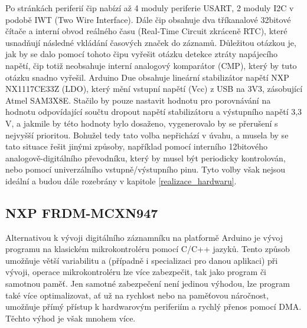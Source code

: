 Po stránkách periferií čip nabízí až 4 moduly periferie USART, 2 moduly I2C v podobě IWT (Two Wire Interface). Dále čip obsahuje dva tříkanalové 32bitové čítače a interní obvod reálného času (Real-Time Circuit zkráceně RTC), které usnadňují následné vkládání časových značek do záznamů. Důležitou otázkou je, jak by se dalo pomocí tohoto čipu vyřešit otázku detekce ztráty napájecího napětí, čip totiž neobsahuje interní analogový komparátor (CMP), který by tuto otázku snadno vyřešil. Arduino Due obsahuje lineární stabilizátor napětí NXP NX1117CE33Z (LDO), který mění vstupní napětí (Vcc) z USB na 3V3, zásobující Atmel SAM3X8E. Stačilo by pouze nastavit hodnotu pro porovnávání na hodnotu odpovídající součtu dropout napětí stabilizátoru a výstupního napětí 3,3 V, a jakmile by této hodnoty bylo dosaženo, vygenerovalo by se přerušení s nejvyšší prioritou. Bohužel tedy tato volba nepřichází v úvahu, a musela by se tato situace řešit jinými způsoby, například pomocí interního 12bitového analogově-digitálního převodníku, který by musel být periodicky kontrolován, nebo pomocí univerzálního vstupně/výstupního pinu. Tyto volby však nejsou ideální a budou dále rozebrány v kapitole \ref{realizace_hardwaru}. \cite{arduino_shop_due, nxp_NX1117C_ldo}


\subsection{NXP FRDM-MCXN947}
Alternativou k vývoji digitálního záznamníku na platformě Arduino je vývoj programu na klasickém mikrokontroléru pomocí C/C++ jazyků. Tento způsob umožňuje větší variabilitu a (případně i specializaci pro danou aplikaci) při vývoji, operace mikrokontroléru lze více zabezpečit, tak jako program či samotnou paměť. Jen samotné zabezpečení není jedinou výhodou, lze program také více optimalizovat, ať už na rychlost nebo na paměťovou náročnost, umožňuje přímý přístup k hardwarovým periferiím a rychlý přenos pomocí DMA. Těchto výhod je však mnohem více. 


